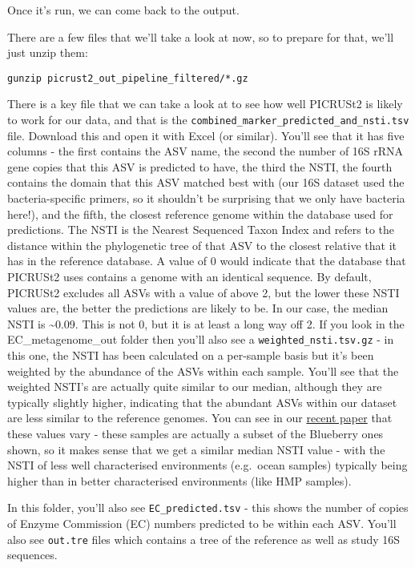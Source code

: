 \documentclass[
]{book}
\begin{document}
Once it's run, we can come back to the output.

There are a few files that we'll take a look at now, so to prepare for that, we'll just unzip them:

\begin{verbatim}
gunzip picrust2_out_pipeline_filtered/*.gz
\end{verbatim}

There is a key file that we can take a look at to see how well PICRUSt2 is likely to work for our data, and that is the \texttt{combined\_marker\_predicted\_and\_nsti.tsv} file. Download this and open it with Excel (or similar). You'll see that it has five columns - the first contains the ASV name, the second the number of 16S rRNA gene copies that this ASV is predicted to have, the third the NSTI, the fourth contains the domain that this ASV matched best with (our 16S dataset used the bacteria-specific primers, so it shouldn't be surprising that we only have bacteria here!), and the fifth, the closest reference genome within the database used for predictions. The NSTI is the Nearest Sequenced Taxon Index and refers to the distance within the phylogenetic tree of that ASV to the closest relative that it has in the reference database. A value of 0 would indicate that the database that PICRUSt2 uses contains a genome with an identical sequence. By default, PICRUSt2 excludes all ASVs with a value of above 2, but the lower these NSTI values are, the better the predictions are likely to be. In our case, the median NSTI is \textasciitilde0.09. This is not 0, but it is at least a long way off 2. If you look in the EC\_metagenome\_out folder then you'll also see a \texttt{weighted\_nsti.tsv.gz} - in this one, the NSTI has been calculated on a per-sample basis but it's been weighted by the abundance of the ASVs within each sample. You'll see that the weighted NSTI's are actually quite similar to our median, although they are typically slightly higher, indicating that the abundant ASVs within our dataset are less similar to the reference genomes. You can see in our \href{https://academic.oup.com/bioinformatics/article/41/5/btaf269/8121151}{recent paper} that these values vary - these samples are actually a subset of the Blueberry ones shown, so it makes sense that we get a similar median NSTI value - with the NSTI of less well characterised environments (e.g.~ocean samples) typically being higher than in better characterised environments (like HMP samples).

In this folder, you'll also see \texttt{EC\_predicted.tsv} - this shows the number of copies of Enzyme Commission (EC) numbers predicted to be within each ASV. You'll also see \texttt{out.tre} files which contains a tree of the reference as well as study 16S sequences.
\end{document}
